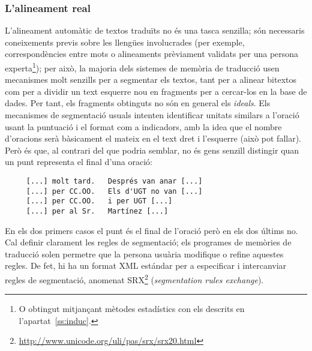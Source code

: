 \subsubsection{L'alineament real}

L'alineament automàtic de textos traduïts no és una tasca senzilla;
són necessaris coneixements previs sobre les llengües involucrades
(per exemple, correspondències entre mots o alineaments prèviament
validats per una persona experta\footnote{O obtingut mitjançant
  mètodes estadístics con els descrits en l'apartat~\ref{ss:induc}.});
per això, la majoria dels sistemes de memòria de traducció usen
mecanismes molt senzills per a segmentar els textos, tant per a
alinear bitextos com per a dividir un text esquerre nou en fragments
per a cercar-los en la base de dades. Per tant, els fragments
obtinguts no són en general els \emph{ideals}.  Els mecanismes de
segmentació usuals intenten identificar unitats similars a l'oració
usant la puntuació i el format com a indicadors, amb la idea que el
nombre d'oracions serà bàsicament el mateix en el text dret i
l'esquerre (això pot fallar). Però és que, al contrari del que podria
semblar, no és gens senzill distingir quan un punt representa el final
d'una oració:
\begin{verbatim}
     [...] molt tard.   Després van anar [...] 
     [...] per CC.OO.   Els d'UGT no van [...] 
     [...] per CC.OO.   i per UGT [...]          
     [...] per al Sr.   Martínez [...]             
\end{verbatim}
En els dos primers casos el punt és el final de l'oració però en els
dos últims no. Cal definir clarament les regles de segmentació; els
programes de memòries de traducció solen permetre que la persona
usuària modifique o refine aquestes regles. De fet, hi ha un format
XML estándar per a especificar i intercanviar regles de segmentació,
anomenat SRX\footnote{\url{http://www.unicode.org/uli/pas/srx/srx20.html}} (\emph{segmentation rules exchange}).

